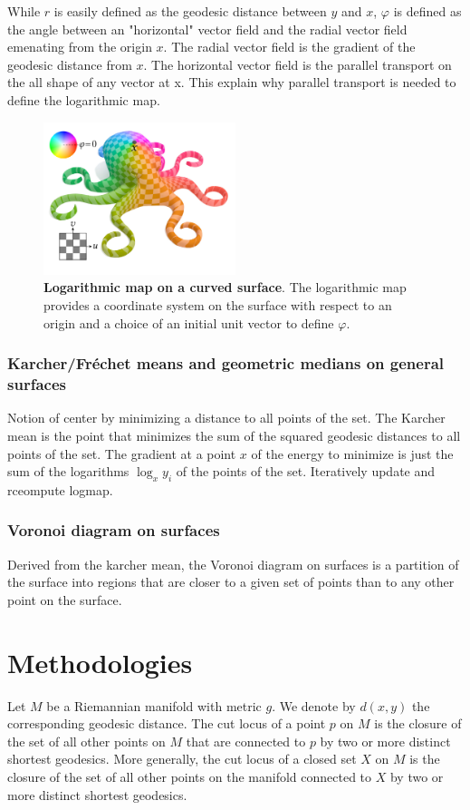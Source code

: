\documentclass[sigconf]{acmart}
\begin{document}
While $r$ is easily defined as the geodesic distance between $y$ and $x$, $\varphi$ is defined as the angle between an "horizontal" vector field and the radial vector field emenating from the origin $x$. The radial vector field is the gradient of the geodesic distance from $x$. The horizontal vector field is the parallel transport on the all shape of any vector at x. This explain why parallel transport is needed to define the logarithmic map. 

\begin{figure}[h]
  \centering
  \includegraphics[width=0.5\textwidth]{img/logmap_paper.png}
  \caption{\textbf{Logarithmic map on a curved surface}. \textmd{The logarithmic map provides a coordinate system on the surface with respect to an origin and a choice of an initial unit vector to define $\varphi$.}}
  \label{fig:logarithmic_map}
\end{figure}


\subsubsection{Karcher/Fréchet means and geometric medians on general surfaces }
Notion of center by minimizing a distance to all points of the set. The Karcher mean is the point that minimizes the sum of the squared geodesic distances to all points of the set. The gradient at a point $x$ of the energy to minimize is just the sum of the logarithms $\log_x y_i$ of the points of the set. Iteratively update and rceompute logmap. 

\subsubsection{Voronoi diagram on surfaces}
Derived from the karcher mean, the Voronoi diagram on surfaces is a partition of the surface into regions that are closer to a given set of points than to any other point on the surface. 


\section{Methodologies}
Let $M$ be a Riemannian manifold with metric $g$. We denote by $d(x,y)$ the corresponding geodesic distance. 
The cut locus of a point $p$ on $M$ is the closure of the set of all other points on $M$ that are connected to $p$
by two or more distinct shortest geodesics. More generally, the cut locus of a closed set $X$ on $M$ is the closure of the set of 
all other points on the manifold connected to $X$ by two or more distinct shortest geodesics.
\end{document}
